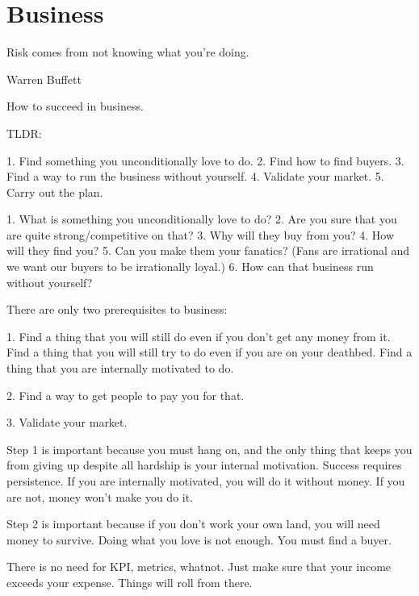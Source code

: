 \chapter{Business}

\epigraph{Risk comes from not knowing what you're doing.}{Warren Buffett}

How to succeed in business.

TLDR:

1. Find something you unconditionally love to do.
2. Find how to find buyers.
3. Find a way to run the business without yourself.
4. Validate your market.
5. Carry out the plan.

1. What is something you unconditionally love to do?
2. Are you sure that you are quite strong/competitive on that?
3. Why will they buy from you?
4. How will they find you?
5. Can you make them your fanatics? (Fans are irrational and we want our buyers to be irrationally loyal.)
6. How can that business run without yourself?

There are only two prerequisites to business:

1. Find a thing that you will still do even if you don't get any money from it.
Find a thing that you will still try to do even if you are on your deathbed.
Find a thing that you are internally motivated to do.

2. Find a way to get people to pay you for that.

3. Validate your market.

Step 1 is important because you must hang on, and the only thing
that keeps you from giving up despite all hardship is your internal motivation.
Success requires persistence.
If you are internally motivated, you will do it without money.
If you are not, money won't make you do it.

Step 2 is important because if you don't work your own land,
you will need money to survive.
Doing what you love is not enough. You must find a buyer.

There is no need for KPI, metrics, whatnot.
Just make sure that your income exceeds your expense.
Things will roll from there.

